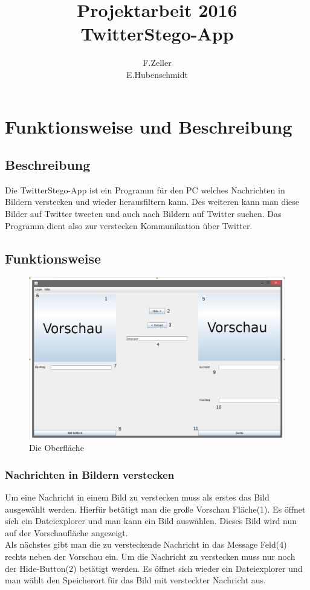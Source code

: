 \documentclass[11pt]{article}
\begin{document}

\title{Projektarbeit 2016\\TwitterStego-App}
\author{F.Zeller\\E.Hubenschmidt}
\maketitle
\newpage

\tableofcontents
\newpage

\section{Funktionsweise und Beschreibung}

\subsection{Beschreibung}
Die TwitterStego-App ist ein Programm für den PC welches Nachrichten in Bildern verstecken und wieder herausfiltern kann. Des weiteren kann man diese Bilder auf Twitter tweeten und auch nach Bildern auf Twitter suchen. Das Programm dient also zur verstecken Kommunikation über Twitter.

\subsection{Funktionsweise}

\begin{figure}[hbtp]
\centering
\includegraphics[scale=0.4]{GuiBeschriftet.PNG}
\caption{Die Oberfläche}
\end{figure}


\subsubsection{Nachrichten in Bildern verstecken}
Um eine Nachricht in einem Bild zu verstecken muss als erstes das Bild ausgewählt werden. Hierfür betätigt man die große Vorschau Fläche(1). Es öffnet sich ein Dateiexplorer und man kann ein Bild auswählen. Dieses Bild wird nun auf der Vorschaufläche angezeigt. 
\\
Als nächstes gibt man die zu versteckende Nachricht in das Message Feld(4) rechts neben der Vorschau ein. Um die Nachricht zu verstecken muss nur noch der Hide-Button(2) betätigt werden. Es öffnet sich wieder ein Dateiexplorer und man wählt den Speicherort für das Bild mit versteckter Nachricht aus.
\end{document}
